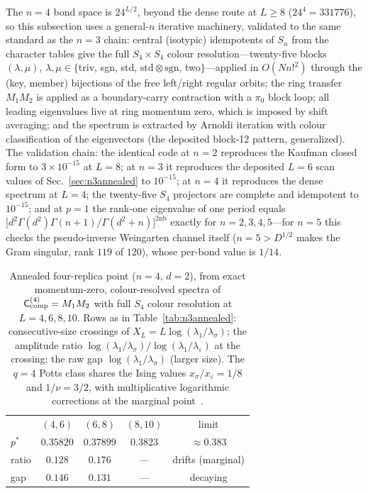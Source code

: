 \documentclass[aps,prx,reprint,superscriptaddress,nobibnotes,longbibliography]{revtex4-2}
\theoremstyle{remark}
\newcommand{\Ccomp}{\mathsf C_{\rm comp}}
\begin{document}
The $n=4$ bond space is $24^{L/2}$, beyond the dense route at $L\ge8$ ($24^4=331776$), so this subsection uses a general-$n$ iterative machinery, validated to the same standard as the $n=3$ chain: central (isotypic) idempotents of $S_n$ from the character tables give the full $S_4\times S_4$ colour resolution---twenty-five blocks $(\lambda,\mu)$, $\lambda,\mu\in\{$triv, sgn, std, $\mathrm{std}\otimes\mathrm{sgn}$, two$\}$---applied in $O(Nn!^2)$ through the (key, member) bijections of the free left/right regular orbits; the ring transfer $M_1M_2$ is applied as a boundary-carry contraction with a $\pi_0$ block loop; all leading eigenvalues live at ring momentum zero, which is imposed by shift averaging; and the spectrum is extracted by Arnoldi iteration with colour classification of the eigenvectors (the deposited block-12 pattern, generalized).  The validation chain: the identical code at $n=2$ reproduces the Kaufman closed form to $3\times10^{-15}$ at $L=8$; at $n=3$ it reproduces the deposited $L=6$ scan values of Sec.~\ref{sec:n3annealed} to $10^{-15}$; at $n=4$ it reproduces the dense spectrum at $L=4$; the twenty-five $S_4$ projectors are complete and idempotent to $10^{-15}$; and at $p=1$ the rank-one eigenvalue of one period equals $\bigl[d^2\Gamma(d^2)\Gamma(n{+}1)/\Gamma(d^2{+}n)\bigr]^{2\mathrm{nb}}$ exactly for $n=2,3,4,5$---for $n=5$ this checks the pseudo-inverse Weingarten channel itself ($n=5>D^{1/2}$ makes the Gram singular, rank $119$ of $120$), whose per-bond value is $1/14$.

\begin{table}[t]
\caption{Annealed four-replica point ($n=4$, $d=2$), from exact momentum-zero, colour-resolved spectra of $\Ccomp^{(4)}=M_1M_2$ with full $S_4$ colour resolution at $L=4,6,8,10$.  Rows as in Table~\ref{tab:n3annealed}: consecutive-size crossings of $X_L=L\log(\lambda_1/\lambda_\sigma)$; the amplitude ratio $\log(\lambda_1/\lambda_\sigma)/\log(\lambda_1/\lambda_\varepsilon)$ at the crossing; the raw gap $\log(\lambda_1/\lambda_\sigma)$ (larger size).  The $q=4$ Potts class shares the Ising values $x_\sigma/x_\varepsilon=1/8$ and $1/\nu=3/2$, with multiplicative logarithmic corrections at the marginal point~\cite{Cardy1986}.}
\label{tab:n4annealed}
\begin{ruledtabular}
\begin{tabular}{lcccc}
 & $(4,6)$ & $(6,8)$ & $(8,10)$ & limit \\
\colrule
$p^*$ & $0.35820$ & $0.37899$ & $0.3823$ & $\approx0.383$ \\
ratio & $0.128$ & $0.176$ & --- & drifts (marginal) \\
gap & $0.146$ & $0.131$ & --- & decaying \\
\end{tabular}
\end{ruledtabular}
\end{table}
\end{document}
